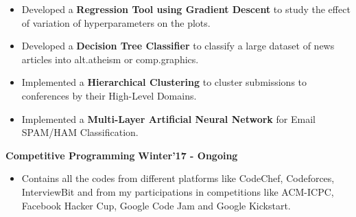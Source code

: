 \documentclass[10pt]{article}
\begin{document}
\begin{itemize}
\item Developed a \textbf{Regression Tool using Gradient Descent} to study the effect of variation of hyperparameters on the plots.\\[-2em]
\item Developed a \textbf{Decision Tree Classifier} to classify a large dataset of news articles into alt.atheism or comp.graphics.\\[-2em]
\item Implemented a \textbf{Hierarchical Clustering} to cluster submissions to conferences by their High-Level Domains.\\[-2em]
\item Implemented a \textbf{Multi-Layer Artificial Neural Network} for Email SPAM/HAM Classification. \\[-1em]
\end{itemize}
\large {\textbf{Competitive Programming}} \normalsize 
\href{https://github.com/shmundhra/Competitive-Codes}{\faGithub}
{\hfill} \textbf{Winter'17 - Ongoing}\\[-1.8em]
\begin{itemize}
\item Contains all the codes from different platforms like CodeChef, Codeforces, InterviewBit and from my participations in competitions like ACM-ICPC, Facebook Hacker Cup, Google Code Jam and Google Kickstart. \\[-2em]
\end{itemize}
\end{document}

